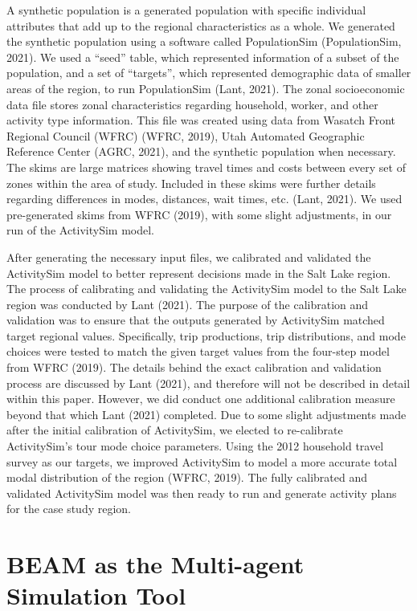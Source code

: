 \documentclass[fancy, masters]{byuthesis}
\begin{document}
A synthetic population is a generated population with specific individual attributes that add up to the regional characteristics as a whole. We generated the synthetic population using a software called PopulationSim (PopulationSim, 2021). We used a ``seed'' table, which represented information of a subset of the population, and a set of ``targets'', which represented demographic data of smaller areas of the region, to run PopulationSim (Lant, 2021). The zonal socioeconomic data file stores zonal characteristics regarding household, worker, and other activity type information. This file was created using data from Wasatch Front Regional Council (WFRC) (WFRC, 2019), Utah Automated Geographic Reference Center (AGRC, 2021), and the synthetic population when necessary. The skims are large matrices showing travel times and costs between every set of zones within the area of study. Included in these skims were further details regarding differences in modes, distances, wait times, etc. (Lant, 2021). We used pre-generated skims from WFRC (2019), with some slight adjustments, in our run of the ActivitySim model.

After generating the necessary input files, we calibrated and validated the ActivitySim model to better represent decisions made in the Salt Lake region. The process of calibrating and validating the ActivitySim model to the Salt Lake region was conducted by Lant (2021). The purpose of the calibration and validation was to ensure that the outputs generated by ActivitySim matched target regional values. Specifically, trip productions, trip distributions, and mode choices were tested to match the given target values from the four-step model from WFRC (2019). The details behind the exact calibration and validation process are discussed by Lant (2021), and therefore will not be described in detail within this paper. However, we did conduct one additional calibration measure beyond that which Lant (2021) completed. Due to some slight adjustments made after the initial calibration of ActivitySim, we elected to re-calibrate ActivitySim's tour mode choice parameters. Using the 2012 household travel survey as our targets, we improved ActivitySim to model a more accurate total modal distribution of the region (WFRC, 2019). The fully calibrated and validated ActivitySim model was then ready to run and generate activity plans for the case study region.

\hypertarget{meth-beam}{%
\section{BEAM as the Multi-agent Simulation Tool}\label{meth-beam}}
\end{document}
